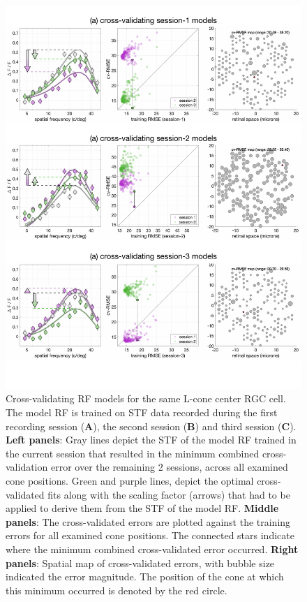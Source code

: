 \documentclass[11pt, oneside]{article}   	%
\begin{document}
\begin{figure}[htbp] %
   \centering
   \includegraphics[width=6in]{Figures/CrossValidationMethod_CrossValidatingSession1Models.pdf} 
   \caption{Cross-validating RF models for the same L-cone center RGC cell. The model RF is trained on STF data recorded during the first recording session (\textbf{A}), the second session (\textbf{B}) and third session (\textbf{C}). \textbf{Left panels}: Gray lines depict the STF of the model RF trained in the current session that resulted in the minimum combined cross-validation error over the remaining 2 sessions, across all examined cone positions. Green and purple lines, depict the optimal cross-validated fits along with the scaling factor (arrows) that had to be applied to derive them from the STF of the model RF.  \textbf{Middle panels}: The cross-validated errors are plotted against the training errors for all examined cone positions. The connected stars indicate where the minimum combined cross-validated error occurred. \textbf{Right panels}: Spatial map of cross-validated errors, with bubble size indicated the error magnitude. The position of the cone at which this minimum occurred is denoted by the red circle.
    }
 \label{fig:CrossValidationApproach_CrossValidatingModels}
\end{figure}
\end{document}
